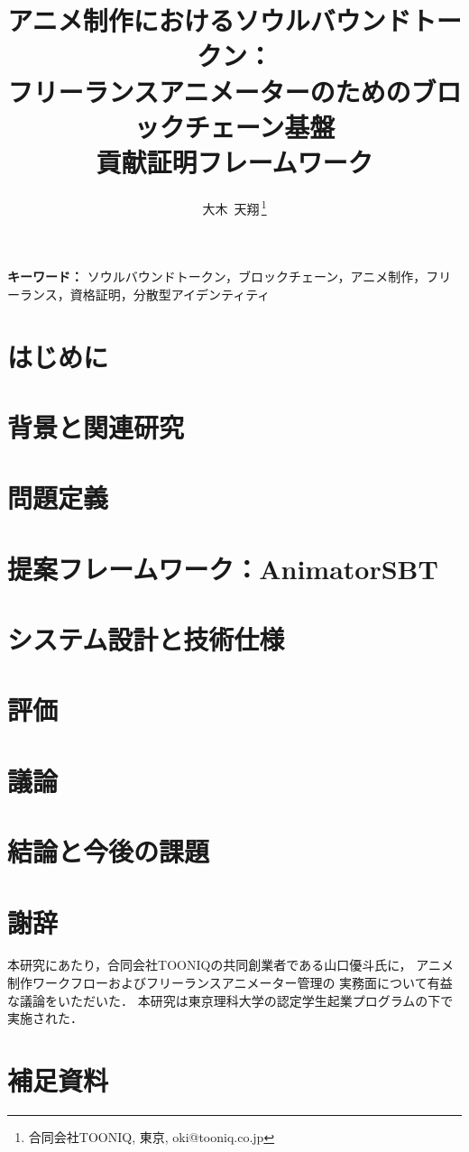 \documentclass[a4paper,10pt,twocolumn]{ltjsarticle}
\title{アニメ制作におけるソウルバウンドトークン：\\フリーランスアニメーターのためのブロックチェーン基盤\\貢献証明フレームワーク}
\author{大木~天翔\,\orcidlink{0009-0001-8009-4929}\thanks{合同会社TOONIQ, 東京, oki@tooniq.co.jp}}
\date{}
\begin{document}
\maketitle

\begin{abstract}

\end{abstract}

\textbf{キーワード：}
ソウルバウンドトークン，ブロックチェーン，アニメ制作，フリーランス，資格証明，分散型アイデンティティ

\section{はじめに}
\label{sec:introduction}


\section{背景と関連研究}
\label{sec:related_work}


\section{問題定義}
\label{sec:problem}


\section{提案フレームワーク：AnimatorSBT}
\label{sec:framework}


\section{システム設計と技術仕様}
\label{sec:implementation}


\section{評価}
\label{sec:evaluation}


\section{議論}
\label{sec:discussion}


\section{結論と今後の課題}
\label{sec:conclusion}


\section*{謝辞}
本研究にあたり，合同会社TOONIQの共同創業者である山口優斗氏に，
アニメ制作ワークフローおよびフリーランスアニメーター管理の
実務面について有益な議論をいただいた．
本研究は東京理科大学の認定学生起業プログラムの下で実施された．




\appendix
\section{補足資料}
\label{sec:appendix}

\end{document}
